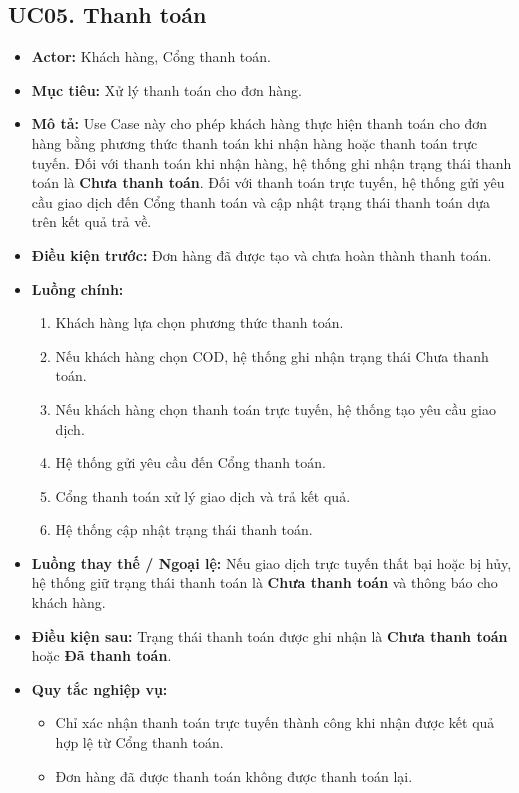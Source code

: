 \documentclass[12pt,a4paper]{article}
\begin{document}
\subsection*{UC05. Thanh toán}

\begin{itemize}

    \item \textbf{Actor:} Khách hàng, Cổng thanh toán.

    \item \textbf{Mục tiêu:} Xử lý thanh toán cho đơn hàng.

    \item \textbf{Mô tả:} Use Case này cho phép khách hàng thực hiện thanh toán cho đơn hàng bằng phương thức thanh toán khi nhận hàng hoặc thanh toán trực tuyến. Đối với thanh toán khi nhận hàng, hệ thống ghi nhận trạng thái thanh toán là \textbf{Chưa thanh toán}. Đối với thanh toán trực tuyến, hệ thống gửi yêu cầu giao dịch đến Cổng thanh toán và cập nhật trạng thái thanh toán dựa trên kết quả trả về.

    \item \textbf{Điều kiện trước:} Đơn hàng đã được tạo và chưa hoàn thành thanh toán.

    \item \textbf{Luồng chính:}
    \begin{enumerate}
        \item Khách hàng lựa chọn phương thức thanh toán.
        \item Nếu khách hàng chọn COD, hệ thống ghi nhận trạng thái Chưa thanh toán.
        \item Nếu khách hàng chọn thanh toán trực tuyến, hệ thống tạo yêu cầu giao dịch.
        \item Hệ thống gửi yêu cầu đến Cổng thanh toán.
        \item Cổng thanh toán xử lý giao dịch và trả kết quả.
        \item Hệ thống cập nhật trạng thái thanh toán.
    \end{enumerate}

    \item \textbf{Luồng thay thế / Ngoại lệ:} Nếu giao dịch trực tuyến thất bại hoặc bị hủy, hệ thống giữ trạng thái thanh toán là \textbf{Chưa thanh toán} và thông báo cho khách hàng.

    \item \textbf{Điều kiện sau:} Trạng thái thanh toán được ghi nhận là \textbf{Chưa thanh toán} hoặc \textbf{Đã thanh toán}.

    \item \textbf{Quy tắc nghiệp vụ:}
    \begin{itemize}
        \item Chỉ xác nhận thanh toán trực tuyến thành công khi nhận được kết quả hợp lệ từ Cổng thanh toán.
        \item Đơn hàng đã được thanh toán không được thanh toán lại.
    \end{itemize}

\end{itemize}
\end{document}
